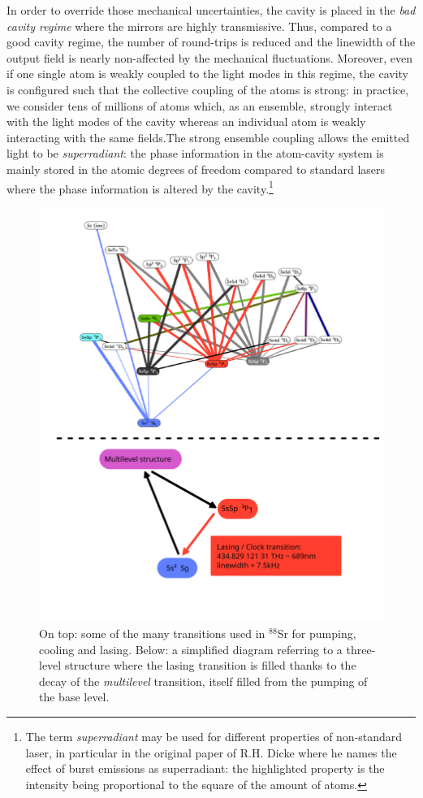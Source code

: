 \documentclass[11pt]{report}
\begin{document}
In order to override those mechanical uncertainties, the cavity is placed in the \textit{bad cavity regime} where the mirrors are highly transmissive. Thus, compared to a good cavity regime, the number of round-trips is reduced and the linewidth of the output field is nearly non-affected by the mechanical fluctuations. Moreover, even if one single atom is weakly coupled to the light modes in this regime, the cavity is configured such that the collective coupling of the atoms is strong: in practice, we consider tens of millions of atoms which, as an ensemble, strongly interact with the light modes of the cavity whereas an individual atom is weakly interacting with the same fields.The strong ensemble coupling allows the emitted light to be \textit{superradiant}:  the phase information in the atom-cavity system is mainly stored in the atomic degrees of freedom compared to standard lasers where the phase information is altered by the cavity.\footnote{The term \textit{superradiant} may be used for different properties of non-standard laser, in particular in the original paper of R.H. Dicke where he names the effect of burst emissions as superradiant: the highlighted property is the intensity being proportional to the square of the amount of atoms.}

\begin{figure}[h!]
\centering
\includegraphics[width=\textwidth]{sr88}
\caption{On top: some of the many transitions used in $^{88}$Sr for pumping, cooling and lasing. Below: a simplified diagram referring to a three-level structure where the lasing transition is filled thanks to the decay of the \textit{multilevel} transition, itself filled from the pumping of the base level.}
\label{fig:sr88}
\end{figure}
\end{document}
